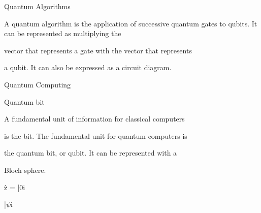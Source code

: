 \documentclass[a4paper,portrait,12pt]{article}
\begin{document}
\begin{flushleft}
Quantum Algorithms
\end{flushleft}





\begin{flushleft}
A quantum algorithm is the application of successive quantum gates to qubits. It can be represented as multiplying the
\end{flushleft}


\begin{flushleft}
vector that represents a gate with the vector that represents
\end{flushleft}


\begin{flushleft}
a qubit. It can also be expressed as a circuit diagram.
\end{flushleft}





\begin{flushleft}
Quantum Computing
\end{flushleft}


\begin{flushleft}
Quantum bit
\end{flushleft}





\begin{flushleft}
A fundamental unit of information for classical computers
\end{flushleft}


\begin{flushleft}
is the bit. The fundamental unit for quantum computers is
\end{flushleft}


\begin{flushleft}
the quantum bit, or qubit. It can be represented with a
\end{flushleft}


\begin{flushleft}
Bloch sphere.
\end{flushleft}


\begin{flushleft}
ẑ = |0i
\end{flushleft}


\begin{flushleft}
|$\psi$i
\end{flushleft}
\end{document}
